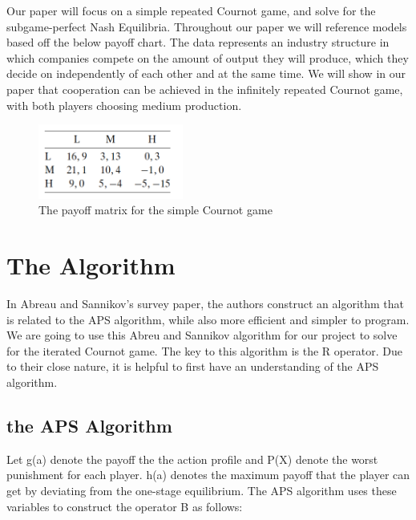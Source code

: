 \documentclass{article}
\begin{document}
	Our paper will focus on a simple repeated Cournot game, and solve for the subgame-perfect Nash Equilibria. Throughout our paper we will reference models based off the below payoff chart. The data represents an industry structure in which companies compete on the amount of output they will produce, which they decide on independently of each other and at the same time. We will show in our paper that cooperation can be achieved in the infinitely repeated Cournot game, with both players choosing medium production. 
	

\begin{figure}[!ht]

\begin{minipage}[b]{1.0\linewidth}
  \centering
  \centerline{\includegraphics[width=4.75cm]{payoff}}
\end{minipage}
\caption{The payoff matrix for the simple Cournot game}
\label{fig:res}
%
\end{figure}

\section{The Algorithm}
\label{sec:format}

In Abreau and Sannikov's survey paper, the authors construct an algorithm that is related to the APS algorithm, while also more efficient and simpler to program.\cite{direct}\cite{survey}\cite{comp} We are going to use this Abreu and Sannikov algorithm for our project to solve for the iterated Cournot game. The key to this algorithm is the R operator. Due to their close nature, it is helpful to first have an understanding of the APS algorithm. 

\subsection{the APS Algorithm}
\label{ssec:subhead}
	
	Let g(a) denote the payoff the the action profile and P(X) denote the worst punishment for each player. h(a) denotes the maximum payoff that the player can get by deviating from the one-stage equilibrium. The APS algorithm uses these variables to construct the operator B as follows: 
	
\end{document}
